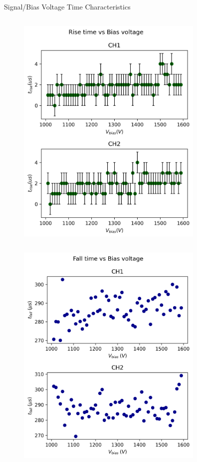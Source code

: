 \begin{columnframe}{Signal/Bias Voltage Time Characteristics}
    \begin{column}{0.5\textwidth}
        \begin{figure}
            \centering
            \includegraphics[width=0.8\textwidth, frame]{images/rise_times_bias.png}
        \end{figure}
    \end{column}
    \begin{column}{0.5\textwidth}
        \begin{figure}
            \centering
            \includegraphics[width=0.8\textwidth, frame]{images/fall_times_bias.png}
        \end{figure}
    \end{column}
\end{columnframe}

